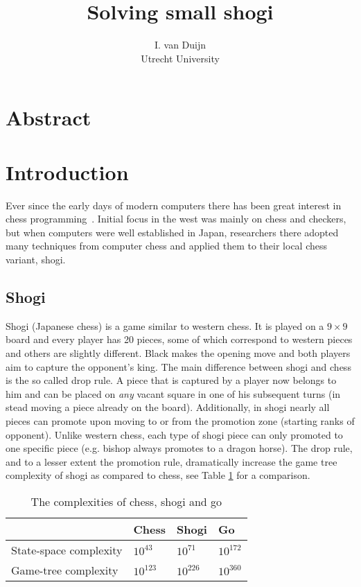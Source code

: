 \documentclass{article}
\title{Solving small shogi}
\author{I. van Duijn \\ Utrecht University}
\begin{document}
\maketitle

\section*{Abstract}

\section{Introduction}
Ever since the early days of modern computers there has been great interest in chess programming~\cite{shannon1950xxii}. Initial
focus in the west was mainly on chess and checkers, but when computers were well established in Japan, researchers there adopted
many techniques from computer chess and applied them to their local chess variant, shogi.

\subsection{Shogi}
Shogi (Japanese chess) is a game similar to western chess. It is played on a $9 \times 9$ board and every
player has 20 pieces, some of which correspond to western pieces and others are slightly different.
Black makes the opening move and both players aim to capture the opponent's king.
The main difference between shogi and chess is the so called drop rule.
A piece that is captured by a player now belongs to him and can be placed on \textit{any} vacant square in one of his subsequent turns
(in stead moving a piece already on the board).
Additionally, in shogi nearly all pieces can promote upon moving to or from the promotion zone (starting ranks of opponent).
Unlike western chess, each type of shogi piece can only promoted to one specific piece (e.g. bishop always promotes to a dragon horse).
The drop rule, and to a lesser extent the promotion rule, dramatically increase the game tree complexity of shogi as compared to chess, see Table
\ref{table:complex} for a comparison.\\
\begin{table}
\center
\begin{tabular}{l l l l}
 & Chess & Shogi & Go \\ \hline
State-space complexity & $10^{43}$ & $10^{71}$ & $10^{172}$ \\
Game-tree complexity & $10^{123}$ & $10^{226}$ & $10^{360}$ \\ \hline
\end{tabular}
\caption{The complexities of chess, shogi and go}
\label{table:complex}
\end{table}
\end{document}
